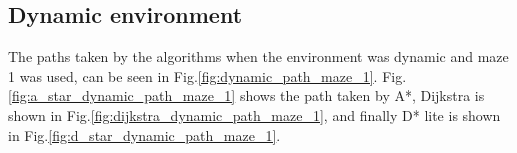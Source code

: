 




\subsection{Dynamic environment}


The paths taken by the algorithms when the environment was dynamic and maze 1 was used, can be seen in Fig.\:\ref{fig:dynamic_path_maze_1}. Fig.\:\ref{fig:a_star_dynamic_path_maze_1} shows the path taken by A*, Dijkstra is shown in Fig.\:\ref{fig:dijkstra_dynamic_path_maze_1}, and finally D* lite is shown in Fig.\:\ref{fig:d_star_dynamic_path_maze_1}.

